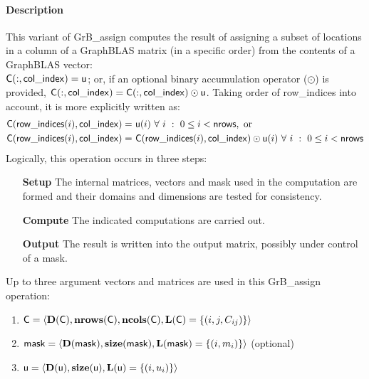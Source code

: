 \paragraph{Description}

This variant of {\sf GrB\_assign} computes the result of assigning a subset of
locations in a column of a GraphBLAS matrix (in a specific order) from the 
contents of a GraphBLAS vector: \\
${\sf C}(:,{\sf col\_index}) = {\sf u}$; or, if an 
optional binary accumulation operator ($\odot$) is provided, 
${\sf C}(:,{\sf col\_index}) = 
{\sf C}(:,{\sf col\_index}) \odot {\sf u}$. Taking order of {\sf row\_indices} 
into account, it is more explicitly written as:
\[
\begin{aligned}
    {\sf C}({\sf row\_indices}(i),{\sf col\_index}) = &\ {\sf u}(i) 
    \ \forall \ i \ : \ 0 \leq i < {\sf nrows}, \mbox{~or~}
    \\
    {\sf C}({\sf row\_indices}(i),{\sf col\_index}) = &\ {\sf C}({\sf row\_indices}(i),{\sf col\_index}) \odot {\sf u}(i) 
    \ \forall \ i \ : \ 0 \leq i < {\sf nrows}
\end{aligned}
\]  
Logically, this operation occurs in three steps:
\begin{enumerate}[leftmargin=0.75in]
\item[\bf Setup] The internal matrices, vectors and mask used in the computation are formed 
and their domains and dimensions are tested for consistency.
\item[\bf Compute] The indicated computations are carried out.
\item[\bf Output] The result is written into the output matrix, possibly under 
control of a mask.
\end{enumerate}

Up to three argument vectors and matrices are used in this {\sf GrB\_assign} 
operation:
\begin{enumerate}
	\item ${\sf C} = \langle \bold{D}({\sf C}),\bold{nrows}({\sf C}),
    \bold{ncols}({\sf C}),\bold{L}({\sf C}) = \{(i,j,C_{ij}) \} \rangle$
    
	\item ${\sf mask} = \langle \bold{D}({\sf mask}),\bold{size}({\sf mask}),
    \bold{L}({\sf mask}) = \{(i,m_{i}) \} \rangle$ (optional)

	\item ${\sf u} = \langle \bold{D}({\sf u}),\bold{size}({\sf u}),
    \bold{L}({\sf u}) = \{(i,u_i) \} \rangle$
\end{enumerate}

